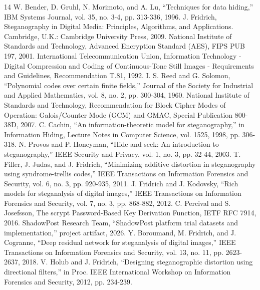 \documentclass[conference]{IEEEtran}
\begin{document}
\begin{thebibliography}{14}
 W. Bender, D. Gruhl, N. Morimoto, and A. Lu, ``Techniques for data hiding,'' IBM Systems Journal, vol. 35, no. 3-4, pp. 313-336, 1996.
 J. Fridrich, Steganography in Digital Media: Principles, Algorithms, and Applications. Cambridge, U.K.: Cambridge University Press, 2009.
 National Institute of Standards and Technology, Advanced Encryption Standard (AES), FIPS PUB 197, 2001.
 International Telecommunication Union, Information Technology - Digital Compression and Coding of Continuous-Tone Still Images - Requirements and Guidelines, Recommendation T.81, 1992.
 I. S. Reed and G. Solomon, ``Polynomial codes over certain finite fields,'' Journal of the Society for Industrial and Applied Mathematics, vol. 8, no. 2, pp. 300-304, 1960.
 National Institute of Standards and Technology, Recommendation for Block Cipher Modes of Operation: Galois/Counter Mode (GCM) and GMAC, Special Publication 800-38D, 2007.
 C. Cachin, ``An information-theoretic model for steganography,'' in Information Hiding, Lecture Notes in Computer Science, vol. 1525, 1998, pp. 306-318.
 N. Provos and P. Honeyman, ``Hide and seek: An introduction to steganography,'' IEEE Security and Privacy, vol. 1, no. 3, pp. 32-44, 2003.
 T. Filler, J. Judas, and J. Fridrich, ``Minimizing additive distortion in steganography using syndrome-trellis codes,'' IEEE Transactions on Information Forensics and Security, vol. 6, no. 3, pp. 920-935, 2011.
 J. Fridrich and J. Kodovsky, ``Rich models for steganalysis of digital images,'' IEEE Transactions on Information Forensics and Security, vol. 7, no. 3, pp. 868-882, 2012.
 C. Percival and S. Josefsson, The scrypt Password-Based Key Derivation Function, IETF RFC 7914, 2016.
 ShadowPost Research Team, ``ShadowPost platform trial datasets and implementation,'' project artifact, 2026.
 Y. Boroumand, M. Fridrich, and J. Cogranne, ``Deep residual network for steganalysis of digital images,'' IEEE Transactions on Information Forensics and Security, vol. 13, no. 11, pp. 2623-2637, 2018.
 V. Holub and J. Fridrich, ``Designing steganographic distortion using directional filters,'' in Proc. IEEE International Workshop on Information Forensics and Security, 2012, pp. 234-239.
\end{thebibliography}
\end{document}
